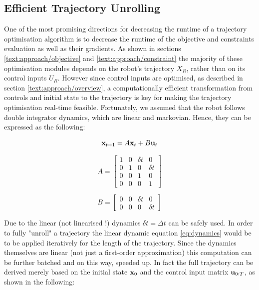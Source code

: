 \subsection{Efficient Trajectory Unrolling}
\label{text:approach/runtime/unrolling}
One of the most promising directions for decreasing the runtime of a trajectory optimisation algorithm is to decrease the runtime of the objective and constraints evaluation as well as their gradients. As shown in sections \ref{text:approach/objective} and \ref{text:approach/constraint} the majority of these optimisation modules depends on the robot's trajectory $X_R$, rather than on its control inputs $U_R$. However since control inputs are optimised, as described in section \ref{text:approach/overview}, a computationally efficient transformation from controls and initial state to the trajectory is key for making the trajectory optimisation real-time feasible.
\newline
Fortunately, we assumed that the robot follows double integrator dynamics, which are linear and markovian. Hence, they can be expressed as the following: 

\begin{equation}
\mathbf{x}_{t+1} = A \mathbf{x}_t + B \mathbf{u}_t
\label{eq:dynamics}
\end{equation}

\begin{minipage}{0.5\textwidth}
$$A = \begin{bmatrix} 1 & 0 & \delta t & 0 \\ 0 & 1 & 0 & \delta t \\ 0 & 0 & 1 & 0 \\ 0 & 0 & 0 & 1\end{bmatrix}$$
\end{minipage}
\begin{minipage}{0.5\textwidth}
$$B = \begin{bmatrix} 0 & 0 & \delta t & 0 \\ 0 & 0 & 0 & \delta t \end{bmatrix}$$
\end{minipage}

Due to the linear (not linearised !) dynamics $\delta t = \Delta t$ can be safely used. In order to fully "unroll" a trajectory the linear dynamic equation \ref{eq:dynamics} would be to be applied iteratively for the length of the trajectory. Since the dynamics themselves are linear (not just a first-order approximation) this computation can be further batched and on this way, speeded up. In fact the full trajectory can be derived merely based on the initial state $\mathbf{x}_0$ and the control input matrix $\mathbf{u}_{0:T}$, as shown in the following:

